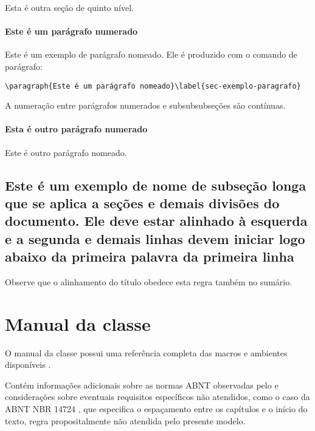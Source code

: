 \label{sec-exemplo-subsubsubsection-outro}

Esta é outra seção de quinto nível.


\paragraph{Este é um parágrafo numerado}\label{sec-exemplo-paragrafo}

Este é um exemplo de parágrafo nomeado. Ele é produzido com o comando de
parágrafo:

\begin{verbatim}
\paragraph{Este é um parágrafo nomeado}\label{sec-exemplo-paragrafo}
\end{verbatim}

A numeração entre parágrafos numerados e subsubsubseções são contínuas.

\paragraph{Esta é outro parágrafo numerado}\label{sec-exemplo-paragrafo-outro}

Este é outro parágrafo nomeado.

\subsection{Este é um exemplo de nome de subseção longa que se aplica a seções e demais divisões do documento. Ele deve estar alinhado à esquerda e a segunda e demais linhas devem iniciar logo abaixo da primeira palavra da primeira linha} 

Observe que o alinhamento do título obedece esta regra também no sumário.
	

\section{Manual da classe \textsf{\abnTeX}}

O manual da classe \textsf{\abnTeX} possui uma referência completa das macros e ambientes disponíveis \cite{abnetxclasse}.

Contém informações adicionais sobre as normas ABNT
observadas pelo \textsf{\abnTeX} e considerações sobre eventuais requisitos específicos
não atendidos, como o caso da ABNT NBR 14724 \cite{nbr14724}, que
especifica o espaçamento entre os capítulos e o início do texto, regra
propositalmente não atendida pelo presente modelo.

